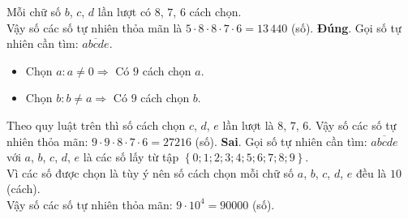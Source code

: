 \begin{ex}
{\begin{itemchoice}
\begin{itemize}
		\end{itemize}
		Mỗi chữ số $b$, $c$, $d$ lần lượt có $8$, $7$, $6$ cách chọn.\\
		Vậy số các số tự nhiên thỏa mãn là	$5\cdot8\cdot8\cdot7\cdot6=13\,440$ (số).
		\itemch \textbf{Đúng}.
		Gọi số tự nhiên cần tìm: $\overline{a b c d e}$.
		\begin{itemize}
			\item Chọn $a\colon a\neq 0\Rightarrow$ Có $9$ cách chọn $a$.
			\item Chọn $b\colon b\neq a\Rightarrow$ Có $9$ cách chọn $b$.
		\end{itemize}
		Theo quy luật trên thì số cách chọn $c$, $d$, $e$ lần lượt là $8$, $7$, $6$. Vậy số các số tự nhiên thỏa mãn: $9\cdot9\cdot8\cdot7\cdot6 =27216$ (số).
		\itemch \textbf{Sai}.
		Gọi số tự nhiên cần tìm: $\overline{a b c d e}$ với $a$, $b$, $c$, $d$, $e$ là các số lấy từ tập $\left\{0; 1; 2; 3; 4; 5; 6; 7; 8; 9\right\}$.\\
		Vì các số được chọn là tùy ý nên số cách chọn mỗi chữ số $a$, $b$, $c$, $d$, $e$ đều là $10$ (cách).\\
		Vậy số các số tự nhiên thỏa mãn: $9\cdot 10^4=90000$ (số).
	\end{itemchoice}
	}
\end{ex}


